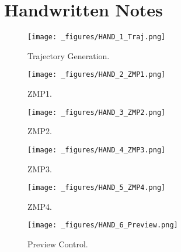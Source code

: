 \documentclass{UoNMCHA}
\begin{document}
	\appendix
		\newpage\section{Handwritten Notes}\label{app:Hand}
		\begin{figure}[!h]
		    \begin{center}
		        \texttt{[image: \_figures/HAND\_1\_Traj.png]}
		        \caption{Trajectory Generation.}
		        \label{fig:APP_TrajGen}
		    \end{center}
		\end{figure}
		\begin{figure}[!h]
		    \begin{center}
		        \texttt{[image: \_figures/HAND\_2\_ZMP1.png]}
		        \caption{ZMP1.}
		        \label{fig:APP_ZMP1}
		    \end{center}
		\end{figure}
		\begin{figure}[!h]
		    \begin{center}
		        \texttt{[image: \_figures/HAND\_3\_ZMP2.png]}
		        \caption{ZMP2.}
		        \label{fig:APP_ZMP2}
		    \end{center}
		\end{figure}
		\begin{figure}[!h]
		    \begin{center}
		        \texttt{[image: \_figures/HAND\_4\_ZMP3.png]}
		        \caption{ZMP3.}
		        \label{fig:APP_ZMP3}
		    \end{center}
		\end{figure}
		\begin{figure}[!h]
		    \begin{center}
		        \texttt{[image: \_figures/HAND\_5\_ZMP4.png]}
		        \caption{ZMP4.}
		        \label{fig:APP_ZMP4}
		    \end{center}
		\end{figure}
		\begin{figure}[!h]
		    \begin{center}
		        \texttt{[image: \_figures/HAND\_6\_Preview.png]}
		        \caption{Preview Control.}
		        \label{fig:APP_PREVIEW}
		    \end{center}
		\end{figure}
		\clearpage
		
\end{document}
